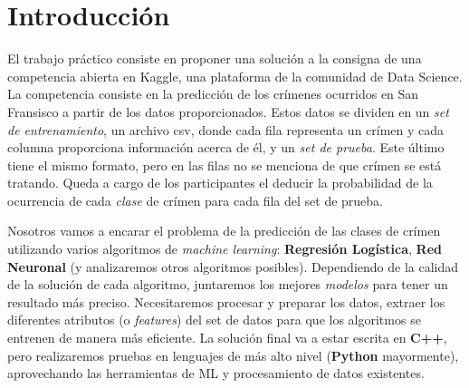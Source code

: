 \section{Introducción} %
\label{sec:introducci_n}

El trabajo práctico consiste en proponer una solución a la consigna de una competencia abierta en Kaggle, una plataforma de la comunidad de Data Science. La competencia consiste en la predicción de los crímenes ocurridos en San Fransisco a partir de los datos proporcionados. Estos datos se dividen en un \textit{set de entrenamiento}, un archivo csv, donde cada fila representa un crímen y cada columna proporciona información acerca de él, y un \textit{set de prueba}. Este último tiene el mismo formato, pero en las filas no se menciona de que crímen se está tratando. Queda a cargo de los participantes el deducir la probabilidad de la ocurrencia de cada \textit{clase} de crímen para cada fila del set de prueba.


Nosotros vamos a encarar el problema de la predicción de las clases de crímen utilizando varios algoritmos de \textit{machine learning}: \textbf{Regresión Logística}, \textbf{Red Neuronal} (y analizaremos otros algoritmos posibles). Dependiendo de la calidad de la solución de cada algoritmo, juntaremos los mejores \textit{modelos} para tener un resultado más preciso. Necesitaremos procesar y preparar los datos, extraer los diferentes atributos (o \textit{features}) del set de datos para que los algoritmos se entrenen de manera más eficiente. La solución final va a estar escrita en \textbf{C++}, pero realizaremos pruebas en lenguajes de más alto nivel (\textbf{Python} mayormente), aprovechando las herramientas de ML y procesamiento de datos existentes.


